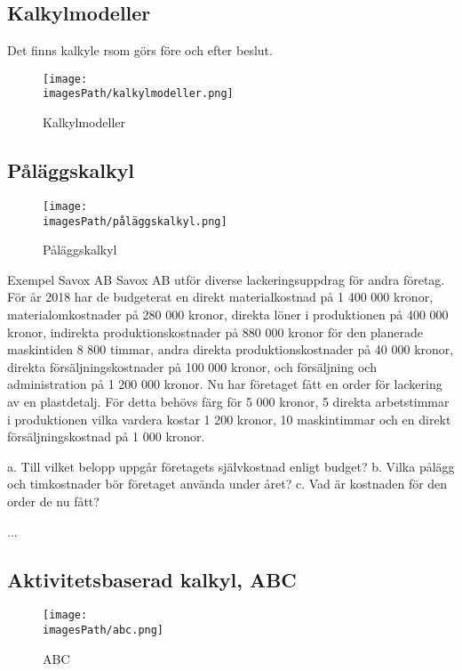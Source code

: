 \documentclass{article}
\newcommand{\imagesPath}{images}
\begin{document}
\subsection{Kalkylmodeller}
Det finns kalkyle rsom görs före och efter beslut.
\begin{figure}[!h]
    \centering
    \texttt{[image: \\imagesPath/kalkylmodeller.png]}
    \caption{Kalkylmodeller}
\end{figure}


\newpage
\subsection{Påläggskalkyl}
\begin{figure}[!h]
    \centering
    \texttt{[image: \\imagesPath/påläggskalkyl.png]}
    \caption{Påläggskalkyl}
\end{figure}

\begin{exampleblock}{Exempel Savox AB}
   Savox AB utför diverse lackeringsuppdrag för andra företag. För år 2018 har de 
   budgeterat en direkt materialkostnad på 1 400 000 kronor, materialomkostnader på 
   280 000 kronor, direkta löner i produktionen på 400 000 kronor, indirekta produktionskostnader 
   på 880 000 kronor för den planerade maskintiden 8 800 timmar, andra direkta 
   produktionskostnader på 40 000 kronor, direkta försäljningskostnader på 100 000 kronor, 
   och försäljning och administration på 1 200 000 kronor. Nu har företaget fått en order för 
   lackering av en plastdetalj. För detta behövs färg för 5 000 kronor, 5 direkta 
   arbetstimmar i produktionen vilka vardera kostar 1 200 kronor, 10 maskintimmar och en 
   direkt försäljningskostnad på 1 000 kronor. 

   a. Till vilket belopp uppgår företagets självkostnad enligt budget?
   b. Vilka pålägg och timkostnader bör företaget använda under året? 
   c. Vad är kostnaden för den order de nu fått? 

   ... %
\end{exampleblock}

%
%
%

\newpage
\subsection{Aktivitetsbaserad kalkyl, ABC}
\begin{figure}[!h]
    \centering
    \texttt{[image: \\imagesPath/abc.png]}
    \caption{ABC}
\end{figure}
\end{document}
